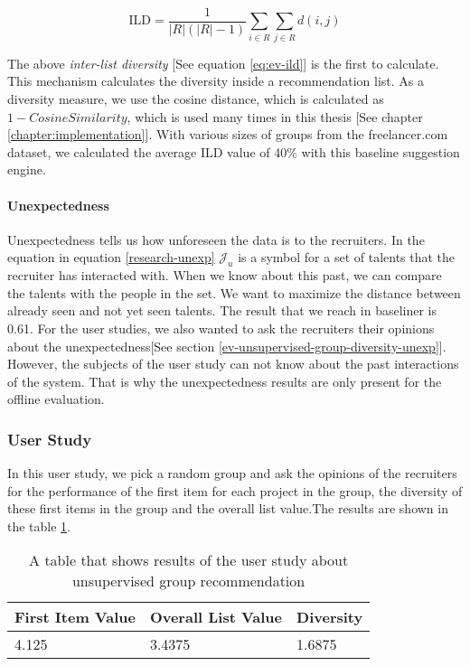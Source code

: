 \begin{equation}
\mathrm { ILD } = \frac { 1 } { | R | ( | R | - 1 ) } \sum _ { i \in R } \sum _ { j \in R } d ( i , j )
\label{eq:ev-ild}
\end{equation}

The above \textit{inter-list diversity} [See equation \eqref{eq:ev-ild}] is the first to calculate. This mechanism calculates the diversity inside a recommendation list. As a diversity measure, we use the cosine distance, which is calculated as $1 - Cosine Similarity$, which is used many times in this thesis [See chapter \ref{chapter:implementation}]. With various sizes of groups from the freelancer.com dataset, we calculated the average ILD value of 40\% with this baseline suggestion engine.

\paragraph{Unexpectedness}\label{ev-unsupervised-group-unexpectedness}

Unexpectedness tells us how unforeseen the data is to the recruiters.  In the equation in equation \eqref{research-unexp} $\mathcal { J } _ { u }$ is a symbol for a set of talents that the recruiter has interacted with. When we know about this past, we can compare the talents with the people in the set. We want to maximize the distance between already seen and not yet seen talents. The result that we reach in baseliner is 0.61. For the user studies, we also wanted to ask the recruiters their opinions about the unexpectedness[See section \ref{ev-unsupervised-group-diversity-unexp}]. However, the subjects of the user study can not know about the past interactions of the system. That is why the unexpectedness results are only present for the offline evaluation. 

\subsubsection{User Study}\label{subsubsection:user-study-first-group}

In this user study, we pick a random group and ask the opinions of the recruiters for the performance of the first item for each project in the group, the diversity of these first items in the group and the overall list value.The results are shown in the table \ref{tab:user-study-group-rec-unsupervised}.

\begin{table}[ht]
	\caption[User study group unsupervised]{A table that shows results of the user study about unsupervised group recommendation}\label{tab:user-study-group-rec-unsupervised}
	\centering
	\begin{tabular}{l l l}
		\toprule
		First Item Value & Overall List Value & Diversity \\
		\midrule
		4.125 & 3.4375&  1.6875\\
		\bottomrule
	\end{tabular}
\end{table}

